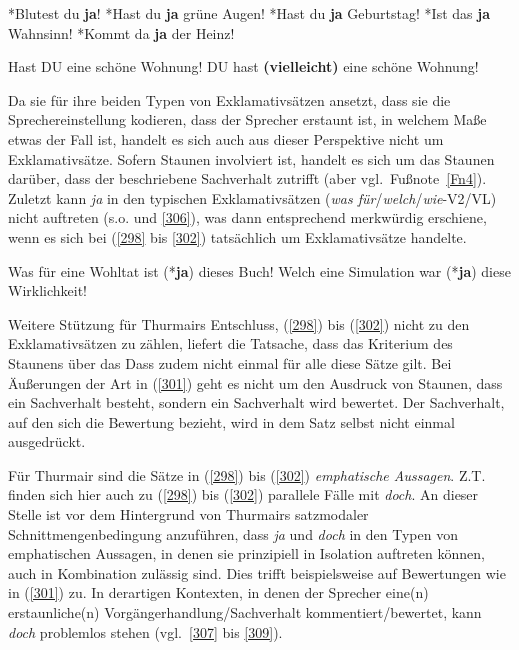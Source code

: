 \begin{exe}
	\ex\label{304} 
		\begin{xlist}	
			\ex\label{304a} *Blutest du \textbf{ja}!	
			\ex\label{304b} *Hast du \textbf{ja} grüne Augen!
			\ex\label{304c} *Hast du \textbf{ja} Geburtstag!
			\ex\label{304d} *Ist das \textbf{ja} Wahnsinn!
			\ex\label{304e} *Kommt da \textbf{ja} der Heinz!
		\end{xlist}
\end{exe}
\begin{exe}
	\ex\label{305} 
		\begin{xlist}	
			\ex\label{305a} Hast DU eine schöne Wohnung!	
			\ex\label{305b} DU hast \textbf{(vielleicht)} eine schöne Wohnung!
		\end{xlist}
\end{exe}
Da sie für ihre beiden Typen von Exklamativsätzen  ansetzt, dass sie die Sprecher\-einstellung kodieren, dass der Sprecher erstaunt ist, in welchem Maße etwas der Fall ist, handelt es sich auch aus dieser Perspektive nicht um Exklamativsätze. Sofern Staunen involviert ist, handelt es sich um das Staunen darüber, dass der beschriebene Sachverhalt zutrifft (aber vgl.\ Fußnote~\ref{Fn4}). Zuletzt kann \textit{ja} in den typi\-schen Exklamativsätzen (\textit{was für}/\textit{welch}/\textit{wie}-V2/VL) nicht auftreten (s.o. und \ref{306}), was dann entsprechend merkwürdig erschiene, wenn es sich bei (\ref{298} bis \ref{302}) tatsächlich um Exklamativsätze handelte.

\begin{exe}
	\ex\label{306} 
		\begin{xlist}	
			\ex\label{306a} Was für eine Wohltat ist (*\textbf{ja}) dieses Buch!
			\ex\label{306b} Welch eine Simulation war (*\textbf{ja}) diese Wirklichkeit!	
			\hfill\hbox{\citet[37]{Kwon2005}}
		\end{xlist}
\end{exe}
Weitere Stützung für Thurmairs Entschluss, (\ref{298}) bis (\ref{302}) nicht zu den Exklamativsätzen zu zählen, liefert die Tatsache, dass das Kriterium des Staunens über das Dass zudem nicht einmal für alle diese Sätze gilt. Bei Äußerungen der Art in (\ref{301}) geht es nicht um den Ausdruck von Staunen, dass ein Sachverhalt besteht, sondern ein Sachverhalt wird bewertet. Der Sachverhalt, auf den sich die Be\-wertung bezieht, wird in dem Satz selbst nicht einmal ausgedrückt.
 
Für Thurmair sind die Sätze in (\ref{298}) bis (\ref{302})  \textit{emphatische Aussagen}. Z.T. finden sich hier auch zu (\ref{298}) bis (\ref{302}) parallele Fälle mit \textit{doch}. An dieser Stelle ist vor dem Hintergrund von Thurmairs satzmodaler Schnittmengenbedingung anzuführen, dass \textit{ja} und \textit{doch} in den Typen von emphatischen Aussagen, in denen sie prinzi\-piell in Isolation auftreten können, auch in Kombination zulässig sind. Dies trifft beispielsweise auf Bewertungen wie in (\ref{301}) zu. In derartigen Kontexten, in denen der Sprecher eine(n) erstaunliche(n) Vorgängerhandlung/Sachverhalt kommentiert/bewertet, kann \textit{doch} problemlos stehen (vgl.\ \ref{307} bis \ref{309}).

